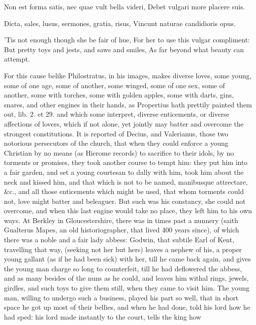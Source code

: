 {Non est forma satis, nec quae vult bella videri,
Debet vulgari more placere suis.

Dicta, sales, lusus, sermones, gratia, risus,
Vincunt naturae candidioris opus.


'Tis not enough though she be fair of hue,
For her to use this vulgar compliment:
But pretty toys and jests, and saws and smiles,
As far beyond what beauty can attempt.

For this cause belike Philostratus, in his images, makes diverse
loves, some young, some of one age, some of another, some winged, some
of one sex, some of another, some with torches, some with golden
apples, some with darts, gins, snares, and other engines in their
hands, as Propertius hath prettily painted them out, lib. 2. et 29. and
which some interpret, diverse enticements, or diverse affections of
lovers, which if not alone, yet jointly may batter and overcome the
strongest constitutions.
It is reported of Decius, and Valerianus, those two notorious
persecutors of the church, that when they could enforce a young
Christian by no means (as Hierome records) to sacrifice to their
idols, by no torments or promises, they took another course to tempt
him: they put him into a fair garden, and set a young courtesan to
dally with him, took him about the neck and kissed him, and that
which is not to be named, manibusque attrectare, \&c., and all those
enticements which might be used, that whom torments could not, love
might batter and beleaguer. But such was his constancy, she could not
overcome, and when this last engine would take no place, they left him
to his own ways. At Berkley in Gloucestershire, there was in
times past a nunnery (saith Gualterus Mapes, an old historiographer,
that lived 400 years since), of which there was a noble and a fair lady
abbess: Godwin, that subtile Earl of Kent, travelling that way,
(seeking not her but hers) leaves a nephew of his, a proper young
gallant (as if he had been sick) with her, till he came back again, and
gives the young man charge so long to counterfeit, till he had
deflowered the abbess, and as many besides of the nuns as he could, and
leaves him withal rings, jewels, girdles, and such toys to give them
still, when they came to visit him. The young man, willing to undergo
such a business, played his part so well, that in short space he got up
most of their bellies, and when he had done, told his lord how he had
sped: his lord made instantly to the court, tells the king how
}
